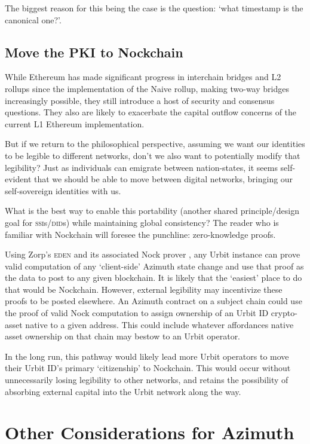 \documentclass[twoside]{article}
\begin{document}
The biggest reason for this being the case is the question: `what timestamp is the canonical one?'.

\subsection[Move the \textsc{pki} to Nockchain]{Move the PKI to Nockchain}

While Ethereum has made significant progress in interchain bridges and L2 rollups since the implementation of the Naive rollup, making two-way bridges increasingly possible, they still introduce a host of security and consensus questions. They also are likely to exacerbate the capital outflow concerns of the current L1 Ethereum implementation.

But if we return to the philosophical perspective, assuming we want our identities to be legible to different networks, don't we also want to potentially modify that legibility? Just as individuals can emigrate between nation-states, it seems self-evident that we should be able to move between digital networks, bringing our self-sovereign identities with us.

What is the best way to enable this portability (another shared principle/design goal for \textsc{ssi}s/\textsc{did}s) while maintaining global consistency? The reader who is familiar with Nockchain will foresee the punchline:  zero-knowledge proofs.

Using Zorp's \textsc{eden} and its associated Nock prover \citep{Zorp2023}, any Urbit instance can prove valid computation of any `client-side' Azimuth state change and use that proof as the data to post to any given blockchain. It is likely that the `easiest' place to do that would be Nockchain. However, external legibility may incentivize these proofs to be posted elsewhere. An Azimuth contract on a subject chain could use the proof of valid Nock computation to assign ownership of an Urbit ID crypto-asset native to a given address. This could include whatever affordances native asset ownership on that chain may bestow to an Urbit operator.

In the long run, this pathway would likely lead more Urbit operators to move their Urbit ID's primary `citizenship' to Nockchain. This would occur without unnecessarily losing legibility to other networks, and retains the possibility of absorbing external capital into the Urbit network along the way.


\section{Other Considerations for Azimuth}
\end{document}
